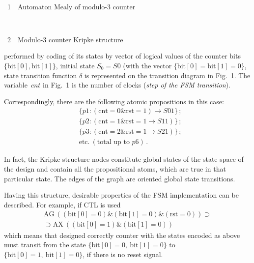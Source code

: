 \begin{multicols}{2}
\begin{center} %
\mbox{%
\epsfxsize=79.49mm
}
\end{center}
\vspace*{4pt}
\begin{center}
{{\figurename~1}\ \ \small{Automaton Mealy of modulo-3 counter}}
\end{center}

\addtocounter{figure}{1}

\begin{center} %
\vspace*{6pt}
\mbox{%
\epsfxsize=79.49mm
}
\end{center}
\vspace*{4pt}
\begin{center}
{{\figurename~2}\ \ \small{Modulo-3 counter Kripke structure}}
\end{center}

\bigskip
\addtocounter{figure}{1}



\noindent
performed by coding of its states by vector of logical values of the counter bits $\{\mathrm{bit}[0], 
\mathrm{bit}[1]\}$,  initial state $S_0=S0$ (with the vector $\{\mathrm{bit}[0]=\mathrm{bit}[1]=0\}$, state transition function 
$\delta$ is represented on the transition diagram in Fig.~1. The variable~$cnt$ in  
Fig.~1 is the number of clocks (\textit{step of the FSM transition}). 

Correspondingly, there are the following atomic propositions in this case:
\begin{align*}
&\{p1:(\mathrm{cnt}=0\&\mathrm{rst}=1) \rightarrow S01\}\,;\\
&\{p2: (\mathrm{cnt}=1\&\mathrm{rst}=1\rightarrow S11)\}\,;\\
&\{p3: (\mathrm{cnt}=2\&\mathrm{rst}=1\rightarrow S21)\}\,;\\
& \mbox{etc.}\ (\mbox{total up to $p$6})\,. 
\end{align*}

In fact, the Kripke structure nodes constitute global states of the state space of the design and 
contain all the propositional atoms, which are true in that particular state. The edges of the graph 
are oriented global state transitions.

Having this structure,  desirable properties of the FSM implementation can be described. For 
example, if  CTL is used
\begin{multline*}
\mathrm{AG}\ ((\mathrm{bit}[0]=0)\&(\mathrm{bit}[1]=0)\&(\mathrm{rst}=0)) \supset{}\\
{}\supset\mathrm{AX}\ ((\mathrm{bit}[0]=1)\&(\mathrm{bit}[1] =0))
\end{multline*}
which means that designed correctly counter with the states encoded as above must transit from 
the state $\{\mathrm{bit}[0]=0,\ \mathrm{bit}[1]=0\}$ to $\{\mathrm{bit}[0]=1,\ \mathrm{bit}[1]=0\}$, 
if there is no reset signal.


\end{multicols}
